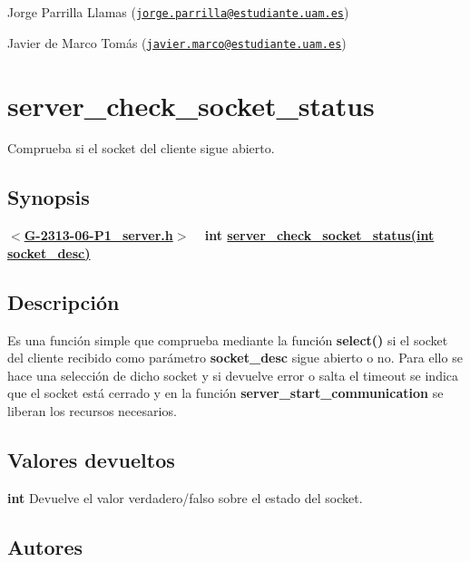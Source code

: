 \begin{DoxyItemize}
\item Jorge Parrilla Llamas (\href{mailto:jorge.parrilla@estudiante.uam.es}{\tt jorge.\+parrilla@estudiante.\+uam.\+es}) 
\item Javier de Marco Tomás (\href{mailto:javier.marco@estudiante.uam.es}{\tt javier.\+marco@estudiante.\+uam.\+es}) 
\end{DoxyItemize}\hypertarget{server_check_socket_status}{}\section{server\+\_\+check\+\_\+socket\+\_\+status}\label{server_check_socket_status}
Comprueba si el socket del cliente sigue abierto.\hypertarget{server_check_socket_status_Synopsis}{}\subsection{Synopsis}\label{server_check_socket_status_Synopsis}
{ {\bfseries $<$\hyperlink{G-2313-06-P1__server_8h}{G-\/2313-\/06-\/\+P1\+\_\+server.\+h}$>$} ~\newline
 {\bfseries int \hyperlink{G-2313-06-P1__server_8c_a64f1fffc5903ccf0350845cd21a95b6e}{server\+\_\+check\+\_\+socket\+\_\+status(int socket\+\_\+desc)}} } \hypertarget{server_check_socket_status_descripcion}{}\subsection{Descripción}\label{server_check_socket_status_descripcion}
Es una función simple que comprueba mediante la función {\bfseries select()} si el socket del cliente recibido como parámetro {\bfseries socket\+\_\+desc} sigue abierto o no. Para ello se hace una selección de dicho socket y si devuelve error o salta el timeout se indica que el socket está cerrado y en la función {\bfseries server\+\_\+start\+\_\+communication} se liberan los recursos necesarios.\hypertarget{server_check_socket_status_return}{}\subsection{Valores devueltos}\label{server_check_socket_status_return}

\begin{DoxyItemize}
\item {\bfseries int} Devuelve el valor verdadero/falso sobre el estado del socket. 
\end{DoxyItemize}\hypertarget{server_check_socket_status_authors}{}\subsection{Autores}\label{server_check_socket_status_authors}

